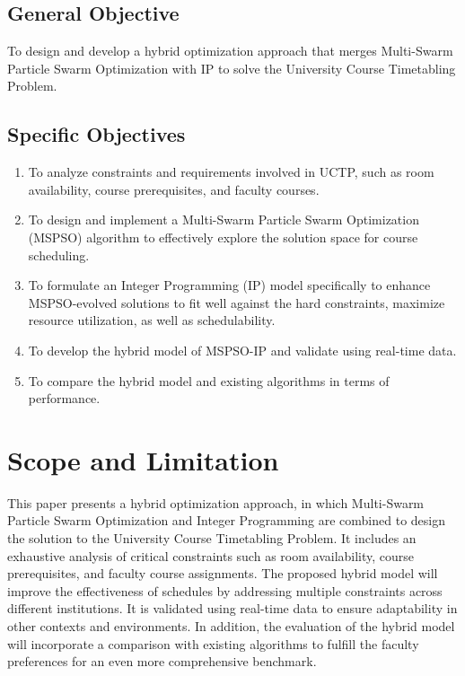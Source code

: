 \documentclass{article}
\begin{document}
\subsection{General Objective}
\label{subsec:generalobjective}

To design and develop a hybrid optimization approach that merges Multi-Swarm Particle Swarm Optimization with IP to solve the University Course Timetabling Problem.  

\subsection{Specific Objectives}
\label{subsec:specificobjectives}
\begin{enumerate}
    \item To analyze constraints and requirements involved in UCTP, such as room availability, course prerequisites, and faculty courses.
    \item To design and implement a Multi-Swarm Particle Swarm Optimization (MSPSO) algorithm to effectively explore the solution space for course scheduling. 
    \item To formulate an Integer Programming (IP) model specifically to enhance MSPSO-evolved solutions to fit well against the hard constraints, maximize resource utilization, as well as schedulability.
    \item To develop the hybrid model of MSPSO-IP and validate using real-time data.
    \item To compare the hybrid model and existing algorithms in terms of performance.
\end{enumerate}

\section{Scope and Limitation}
\label{sec:scopeandlimitation}

This paper presents a hybrid optimization approach, in which Multi-Swarm Particle Swarm Optimization and Integer Programming are combined to design the solution to the University Course Timetabling Problem. It includes an exhaustive analysis of critical constraints such as room availability, course prerequisites, and faculty course assignments. The proposed hybrid model will improve the effectiveness of schedules by addressing multiple constraints across different institutions. It is validated using real-time data to ensure adaptability in other contexts and environments. In addition, the evaluation of the hybrid model will incorporate a comparison with existing algorithms to fulfill the faculty preferences for an even more comprehensive benchmark.
\end{document}
